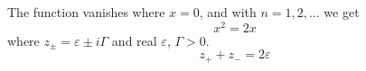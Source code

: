 
The function vanishes where $x = 0$, and with $n = 1, 2, \dots$ we get
\begin{equation}\label{eq:sq} x^2 = 2x \end{equation}
where $z_\pm = \varepsilon \pm i\Gamma$ and real $\varepsilon$, $\Gamma>0$.
\begin{equation}\label{eq:zz} z_+ + z_- = 2\varepsilon \end{equation}

